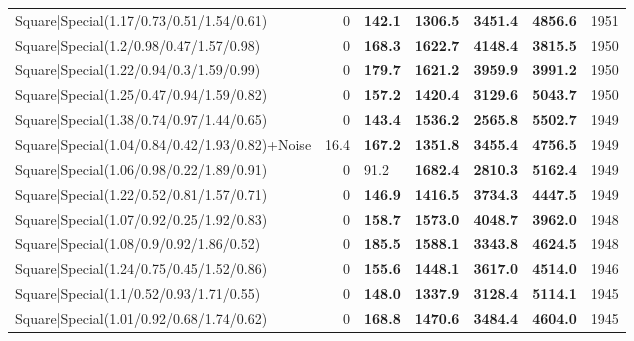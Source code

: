 \begin{tabular}{lrllllr}
 Square|Special(1.17/0.73/0.51/1.54/0.61)                      &             0   & \textbf{142.1} & \textbf{1306.5} & \textbf{3451.4} & \textbf{4856.6} &         1951 \\
 Square|Special(1.2/0.98/0.47/1.57/0.98)                       &             0   & \textbf{168.3} & \textbf{1622.7} & \textbf{4148.4} & \textbf{3815.5} &         1950 \\
 Square|Special(1.22/0.94/0.3/1.59/0.99)                       &             0   & \textbf{179.7} & \textbf{1621.2} & \textbf{3959.9} & \textbf{3991.2} &         1950 \\
 Square|Special(1.25/0.47/0.94/1.59/0.82)                      &             0   & \textbf{157.2} & \textbf{1420.4} & \textbf{3129.6} & \textbf{5043.7} &         1950 \\
 Square|Special(1.38/0.74/0.97/1.44/0.65)                      &             0   & \textbf{143.4} & \textbf{1536.2} & \textbf{2565.8} & \textbf{5502.7} &         1949 \\
 Square|Special(1.04/0.84/0.42/1.93/0.82)+Noise                &            16.4 & \textbf{167.2} & \textbf{1351.8} & \textbf{3455.4} & \textbf{4756.5} &         1949 \\
 Square|Special(1.06/0.98/0.22/1.89/0.91)                      &             0   & 91.2           & \textbf{1682.4} & \textbf{2810.3} & \textbf{5162.4} &         1949 \\
 Square|Special(1.22/0.52/0.81/1.57/0.71)                      &             0   & \textbf{146.9} & \textbf{1416.5} & \textbf{3734.3} & \textbf{4447.5} &         1949 \\
 Square|Special(1.07/0.92/0.25/1.92/0.83)                      &             0   & \textbf{158.7} & \textbf{1573.0} & \textbf{4048.7} & \textbf{3962.0} &         1948 \\
 Square|Special(1.08/0.9/0.92/1.86/0.52)                       &             0   & \textbf{185.5} & \textbf{1588.1} & \textbf{3343.8} & \textbf{4624.5} &         1948 \\
 Square|Special(1.24/0.75/0.45/1.52/0.86)                      &             0   & \textbf{155.6} & \textbf{1448.1} & \textbf{3617.0} & \textbf{4514.0} &         1946 \\
 Square|Special(1.1/0.52/0.93/1.71/0.55)                       &             0   & \textbf{148.0} & \textbf{1337.9} & \textbf{3128.4} & \textbf{5114.1} &         1945 \\
 Square|Special(1.01/0.92/0.68/1.74/0.62)                      &             0   & \textbf{168.8} & \textbf{1470.6} & \textbf{3484.4} & \textbf{4604.0} &         1945 \\

\end{tabular}
